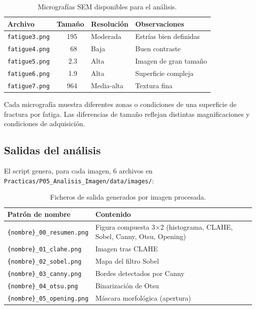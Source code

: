 \documentclass[12pt,a4paper]{article}
\begin{document}
\begin{table}[H]
	\centering
	\caption{Micrografías SEM disponibles para el análisis.}
	\label{tab:imagenes}
	\begin{tabular}{l r l l}
		\toprule
		\textbf{Archivo}      & \textbf{Tamaño}        & \textbf{Resolución}
		                      & \textbf{Observaciones}                          \\
		\midrule
		\texttt{fatigue3.png} & \SI{195}{\kilo\byte}
		                      & Moderada               & Estrías bien definidas \\
		\texttt{fatigue4.png} & \SI{68}{\kilo\byte}
		                      & Baja                   & Buen contraste         \\
		\texttt{fatigue5.png} & \SI{2.3}{\mega\byte}
		                      & Alta                   & Imagen de gran tamaño  \\
		\texttt{fatigue6.png} & \SI{1.9}{\mega\byte}
		                      & Alta                   & Superficie compleja    \\
		\texttt{fatigue7.png} & \SI{964}{\kilo\byte}
		                      & Media-alta             & Textura fina           \\
		\bottomrule
	\end{tabular}
\end{table}

Cada micrografía muestra diferentes zonas o condiciones de una superficie
de fractura por fatiga.  Las diferencias de tamaño reflejan distintas
magnificaciones y condiciones de adquisición.

\subsection{Salidas del análisis}

El script genera, para cada imagen, 6 archivos en
\texttt{Practicas/P05\_Analisis\_Imagen/data/images/}:

\begin{table}[H]
	\centering
	\caption{Ficheros de salida generados por imagen procesada.}
	\label{tab:salidas}
	\small
	\begin{tabular}{l l}
		\toprule
		\textbf{Patrón de nombre}            & \textbf{Contenido}             \\
		\midrule
		\texttt{\{nombre\}\_00\_resumen.png} & Figura compuesta 3$\times$2
		(histograma, CLAHE, Sobel, Canny, Otsu, Opening)                      \\
		\texttt{\{nombre\}\_01\_clahe.png}   & Imagen tras CLAHE              \\
		\texttt{\{nombre\}\_02\_sobel.png}   & Mapa del filtro Sobel          \\
		\texttt{\{nombre\}\_03\_canny.png}   & Bordes detectados por Canny    \\
		\texttt{\{nombre\}\_04\_otsu.png}    & Binarización de Otsu           \\
		\texttt{\{nombre\}\_05\_opening.png} & Máscara morfológica (apertura) \\
		\bottomrule
	\end{tabular}
\end{table}
\end{document}
